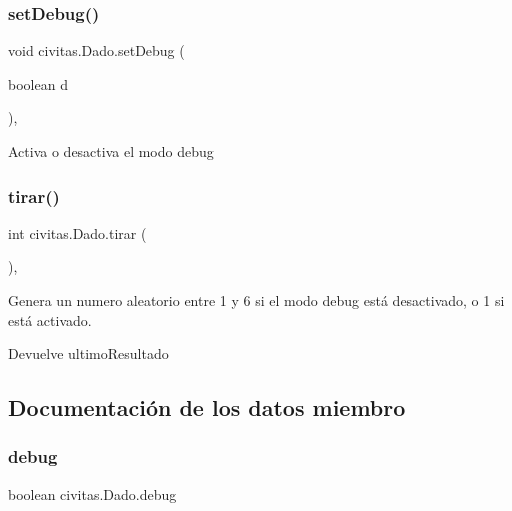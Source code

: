 \subsubsection{\texorpdfstring{set\+Debug()}{setDebug()}}
{\footnotesize\ttfamily void civitas.\+Dado.\+set\+Debug (\begin{DoxyParamCaption}\item[{boolean}]{d }\end{DoxyParamCaption})\hspace{0.3cm}{\ttfamily [inline]}, {\ttfamily [package]}}

Activa o desactiva el modo debug \mbox{\label{classcivitas_1_1Dado_a178066d320c6cd7c79ac3a5863702fb8}} 
\subsubsection{\texorpdfstring{tirar()}{tirar()}}
{\footnotesize\ttfamily int civitas.\+Dado.\+tirar (\begin{DoxyParamCaption}{ }\end{DoxyParamCaption})\hspace{0.3cm}{\ttfamily [inline]}, {\ttfamily [package]}}

Genera un numero aleatorio entre 1 y 6 si el modo debug está desactivado, o 1 si está activado. \begin{DoxyReturn}{Devuelve}
ultimo\+Resultado 
\end{DoxyReturn}


\subsection{Documentación de los datos miembro}
\mbox{\label{classcivitas_1_1Dado_abcc67206a87c44e0960408d447b4cccb}} 
\subsubsection{\texorpdfstring{debug}{debug}}
{\footnotesize\ttfamily boolean civitas.\+Dado.\+debug\hspace{0.3cm}{\ttfamily [private]}}

\mbox{\label{classcivitas_1_1Dado_a579634749a6f9f18f964cc04e181b002}} 
